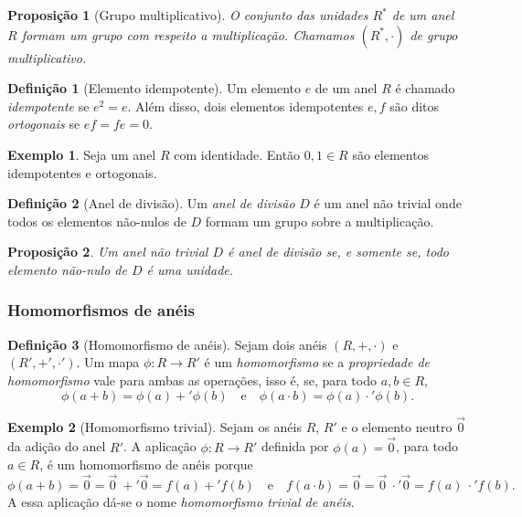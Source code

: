 \documentclass[a4paper,12pt]{report}
\theoremstyle{plain}
\newtheorem{proposicao}{Proposição}[section]
\theoremstyle{definition}
\newtheorem{definicao}{Definição}[section]
\newtheorem{exemplo}{Exemplo}[section]
\begin{document}
\begin{proposicao}[Grupo multiplicativo]
	O conjunto das unidades $R^*$ de um anel $R$ formam um grupo com respeito a multiplicação. Chamamos $(R^*,\cdot)$ de \emph{grupo multiplicativo}.
\end{proposicao}

\begin{definicao}[Elemento idempotente]
	Um elemento $e$ de um anel $R$ é chamado \emph{idempotente} se $e^2 = e$. Além disso, dois elementos idempotentes $e,f$ são ditos \emph{ortogonais} se $ef = fe = 0$.
\end{definicao}

\begin{exemplo}
	Seja um anel $R$ com identidade. Então $0,1 \in R$ são elementos idempotentes e ortogonais.
\end{exemplo}

\begin{definicao}[Anel de divisão]
	Um \emph{anel de divisão} $D$ é um anel não trivial onde todos os elementos não-nulos de $D$ formam um grupo sobre a multiplicação. 
\end{definicao}

\begin{proposicao}
	Um anel não trivial $D$ é anel de divisão se, e somente se, todo elemento não-nulo de $D$ é uma unidade.	
\end{proposicao}

\subsubsection{Homomorfismos de anéis}

\begin{definicao}[Homomorfismo de anéis]
	Sejam dois anéis $(R, +, \cdot)$ e $(R', +', \cdot')$. Um mapa $\phi: R \longrightarrow R'$ é um \emph{homomorfismo} se a \emph{propriedade de homomorfismo} vale para ambas as operações, isso é, se, para todo $a,b\in R$,
	$$\phi(a+b) = \phi(a) +' \phi(b) \quad \text{e} \quad \phi(a\cdot b) = \phi(a) \cdot' \phi(b).$$
\end{definicao}

\begin{exemplo}[Homomorfismo trivial]
	Sejam os anéis $R$, $R'$ e o elemento neutro $\vec 0$ da adição do anel $R'$. A aplicação $\phi: R\longrightarrow R'$ definida por $\phi(a) = \vec 0$, para todo $a\in R$, é um homomorfismo de anéis porque $$\phi(a + b) = \vec 0 = \vec 0 \ +' \vec 0 = f(a) +' f(b) \quad \text{e} \quad f(a\cdot b) = \vec 0 = \vec 0 \ \cdot' \vec 0 = f(a)\ \cdot' f(b).$$
	A essa aplicação dá-se o nome \emph{homomorfismo trivial de anéis}.
\end{exemplo}
\end{document}
